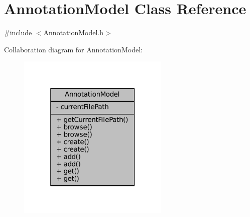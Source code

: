 \hypertarget{classAnnotationModel}{}\section{Annotation\+Model Class Reference}
\label{classAnnotationModel}


{\ttfamily \#include $<$Annotation\+Model.\+h$>$}



Collaboration diagram for Annotation\+Model\+:
\nopagebreak
\begin{figure}[H]
\begin{center}
\leavevmode
\includegraphics[width=205pt]{classAnnotationModel__coll__graph}
\end{center}
\end{figure}
